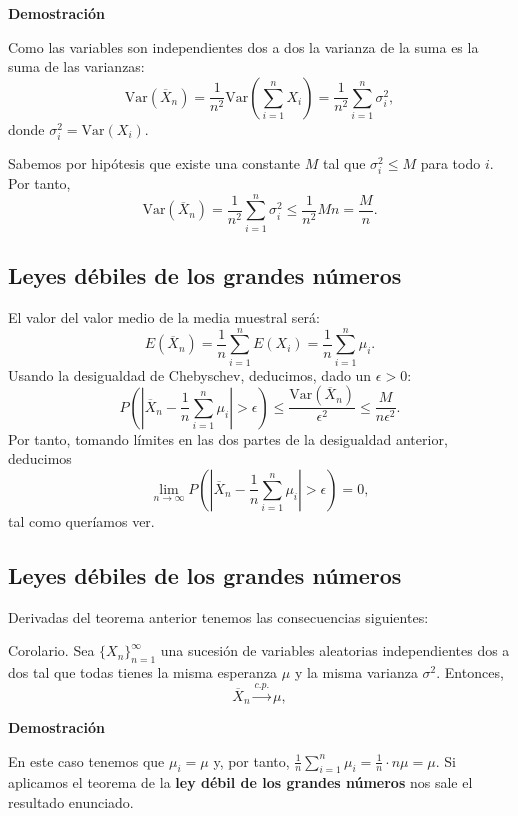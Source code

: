 \documentclass[]{book}
\begin{document}
\textbf{Demostración}

Como las variables son independientes dos a dos la varianza de la suma es la suma de las varianzas:
\[
\mathrm{Var}(\overline{X}_n)=\frac{1}{n^2}\mathrm{Var}(\sum_{i=1}^n X_i)=\frac{1}{n^2}\sum_{i=1}^n \sigma_i^2,
\]
donde \(\sigma_i^2 = \mathrm{Var}(X_i)\).

Sabemos por hipótesis que existe una constante \(M\) tal que \(\sigma_i^2\leq M\) para todo \(i\). Por tanto,
\[
\mathrm{Var}(\overline{X}_n)=\frac{1}{n^2}\sum_{i=1}^n \sigma_i^2\leq \frac{1}{n^2}Mn =\frac{M}{n}.
\]

\hypertarget{leyes-duxe9biles-de-los-grandes-nuxfameros-2}{%
\subsection{Leyes débiles de los grandes números}\label{leyes-duxe9biles-de-los-grandes-nuxfameros-2}}

El valor del valor medio de la media muestral será:
\[
E(\overline{X}_n)=\frac{1}{n}\sum_{i=1}^n E(X_i)=\frac{1}{n}\sum_{i=1}^n \mu_i. 
\]
Usando la desigualdad de Chebyschev, deducimos, dado un \(\epsilon >0\):
\[
P\left(\left|\overline{X}_n-\frac{1}{n}\sum_{i=1}^n \mu_i\right|>\epsilon\right) \leq \frac{\mathrm{Var}(\overline{X}_n)}{\epsilon^2}\leq \frac{M}{n\epsilon^2}.
\]
Por tanto, tomando límites en las dos partes de la desigualdad anterior, deducimos
\[
\lim_{n\to \infty}P\left(\left|\overline{X}_n-\frac{1}{n}\sum_{i=1}^n \mu_i\right|>\epsilon\right) =0,
\]
tal como queríamos ver.

\hypertarget{leyes-duxe9biles-de-los-grandes-nuxfameros-3}{%
\subsection{Leyes débiles de los grandes números}\label{leyes-duxe9biles-de-los-grandes-nuxfameros-3}}

Derivadas del teorema anterior tenemos las consecuencias siguientes:

Corolario.
Sea \(\{X_n\}_{n=1}^\infty\) una sucesión de variables aleatorias independientes dos a dos tal que todas tienes la misma esperanza \(\mu\) y la misma varianza \(\sigma^2\). Entonces,
\[
\overline{X}_n\stackrel{c.p.}{\longrightarrow} \mu,
\]

\textbf{Demostración}

En este caso tenemos que \(\mu_i=\mu\) y, por tanto, \(\frac{1}{n}\sum\limits_{i=1}^n \mu_i =\frac{1}{n}\cdot n\mu=\mu\). Si aplicamos el teorema de la \textbf{ley débil de los grandes números} nos sale el resultado enunciado.
\end{document}
